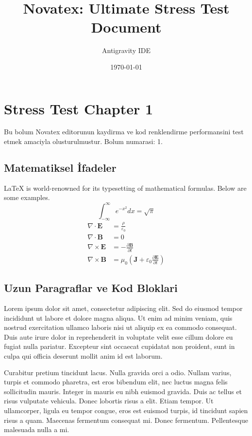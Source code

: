 \documentclass[12pt,a4paper]{article}
\title{\textbf{Novatex: Ultimate Stress Test Document}}
\author{Antigravity IDE}
\date{\today}
\begin{document}
\maketitle
\tableofcontents
\newpage

\section{Stress Test Chapter 1}
Bu bolum Novatex editorunun kaydirma ve kod renklendirme performansini test etmek amaciyla olusturulmustur. Bolum numarasi: 1.

\subsection{Matematiksel İfadeler}
\LaTeX{} is world-renowned for its typesetting of mathematical formulas. Below are some examples.
\begin{equation}
\int_{-\infty}^{\infty} e^{-x^2} dx = \sqrt{\pi}
\end{equation}
\begin{align}
\nabla \cdot \mathbf{E} &= \frac{\rho}{\varepsilon_0} \\
\nabla \cdot \mathbf{B} &= 0 \\
\nabla \times \mathbf{E} &= -\frac{\partial \mathbf{B}}{\partial t} \\
\nabla \times \mathbf{B} &= \mu_0\left(\mathbf{J} + \varepsilon_0 \frac{\partial \mathbf{E}}{\partial t}\right)
\end{align}
\subsection{Uzun Paragraflar ve Kod Bloklari}
Lorem ipsum dolor sit amet, consectetur adipiscing elit. Sed do eiusmod tempor incididunt ut labore et dolore magna aliqua. Ut enim ad minim veniam, quis nostrud exercitation ullamco laboris nisi ut aliquip ex ea commodo consequat. Duis aute irure dolor in reprehenderit in voluptate velit esse cillum dolore eu fugiat nulla pariatur. Excepteur sint occaecat cupidatat non proident, sunt in culpa qui officia deserunt mollit anim id est laborum.

Curabitur pretium tincidunt lacus. Nulla gravida orci a odio. Nullam varius, turpis et commodo pharetra, est eros bibendum elit, nec luctus magna felis sollicitudin mauris. Integer in mauris eu nibh euismod gravida. Duis ac tellus et risus vulputate vehicula. Donec lobortis risus a elit. Etiam tempor. Ut ullamcorper, ligula eu tempor congue, eros est euismod turpis, id tincidunt sapien risus a quam. Maecenas fermentum consequat mi. Donec fermentum. Pellentesque malesuada nulla a mi.
\end{document}
